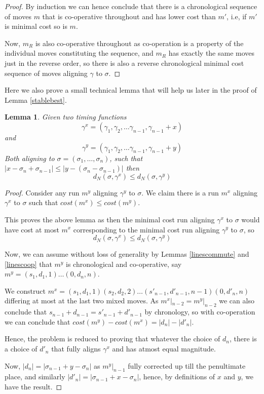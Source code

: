 \documentclass{article}
\newtheorem{lemma}[theorem]{Lemma}
\theoremstyle{Definition}
\theoremstyle{definition}
\begin{document}
\begin{proof}
	By induction we can hence conclude that there is a chronological sequence of moves $m$ that is co-operative throughout and has lower cost than $m'$, i.e, if $m'$ is minimal cost so is $m$.  
	
	Now, $m_R$ is also co-operative throughout as co-operation is a property of the individual moves constituting the sequence, and $m_R$ has exactly the same moves just in the reverse order, so there is also a reverse chronological minimal cost sequence of moves aligning $\gamma$ to $\sigma$. 
	
\end{proof}
	
	Here we also prove a small technical lemma that will help us later in the proof of Lemma \ref{stablebest}. 
	
	\begin{lemma}\label{cooplast}
		Given two timing functions $$\gamma^x = (\gamma_1, \gamma_2, \dots \gamma_{n-1}, \gamma_{n-1} + x)$$ and $$\gamma^y = (\gamma_1, \gamma_2, \dots \gamma_{n-1}, \gamma_{n-1} + y)$$ Both aligning to $\sigma = (\sigma_1, \dots, \sigma_n)$, such that $|x - \sigma_n + \sigma_{n-1}| \leq |y - (\sigma_n - \sigma_{n-1})|$ then $$d_N(\sigma, \gamma^x) \leq d_N(\sigma, \gamma^y)$$ 
	\end{lemma}

\begin{proof}
	Consider any run $m^y$ aligning $\gamma^y$ to $\sigma$. 
	We claim there is a run $m^x$ aligning $\gamma^x$ to $\sigma$ such that $cost(m^x) \leq cost(m^y)$. 
	
	This proves the above lemma as then the minimal cost run aligning $\gamma^x$ to $\sigma$ would have cost at most $m^x$ corresponding to the minimal cost run aligning $\gamma^y$ to $\sigma$, so $$d_N(\sigma, \gamma^x) \leq d_N(\sigma, \gamma^y)$$
	
	Now, we can assume without loss of generality by Lemmas \ref{linescommute} and \ref{linescoop}  that $m^y$ is chronological and co-operative, say $m^y = (s_1, d_1, 1) \dots (0, d_n, n)$. 
	
	We construct $m^x = (s_1, d_1, 1)(s_2, d_2, 2)\dots (s'_{n-1}, d'_{n-1}, n-1)(0, d'_n, n)$ differing at most at the last two mixed moves. 
	As $m^x|_{n-2} = m^y|_{n-2}$ we can also conclude that $s_{n-1} + d_{n-1} = s'_{n-1} + d'_{n-1}$ by chronology, so with co-operation we can conclude that $cost(m^y) - cost(m^x) = |d_n| - |d'_n|$. 
	
	Hence, the problem is reduced to proving that whatever the choice of $d_n$, there is a choice of $d'_n$ that fully aligns $\gamma^x$ and has atmost equal magnitude. 
	
	Now, $|d_n| = |\sigma_{n-1} + y - \sigma_n|$ as $m^y|_{n-1}$ fully corrected up till the penultimate place, and similarly $|d'_n| = |\sigma_{n-1} + x - \sigma_n|$, hence, by definitions of $x$ and $y$, we have the result. 
	
\end{proof}
	
\end{document}
